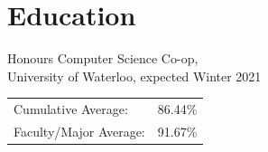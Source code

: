 \documentclass{resume}
\begin{document}
\begin{minipage}[t]{0.35\linewidth}
\section{Education}
Honours Computer Science Co-op,\\
{\footnotesize University of Waterloo, expected Winter 2021}
\smallskip\par
{
    \begin{tabular}{@{}l r}
        Cumulative Average: & 86.44\%\\
        Faculty/Major Average: & 91.67\% 
    \end{tabular}
}

\end{minipage}
\hfill
%
\begin{minipage}[t]{0.63\linewidth}

\end{minipage}
\end{document}
